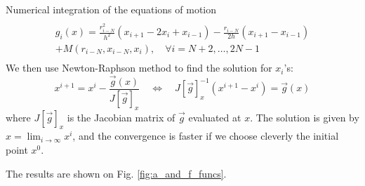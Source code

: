 \begin{subsection}{Numerical integration of the equations of motion}
\begin{multline}
  \end{multline}
  \begin{multline}
    g_i(x) = \frac{r_{i-N}^2}{h^2}\left(x_{i+1}-2x_i+x_{i-1}\right)-\frac{r_{i-N}}{2h}\left(x_{i+1}-x_{i-1}\right)\\
    +M(r_{i-N}, x_{i-N}, x_i),\quad
    \forall i = N+2,\dots,2N-1\\
  \end{multline}
  We then use Newton-Raphson method to find the solution for
  $x_i$'s:
  \begin{equation}
    x^{i+1} = x^i - \frac{\vec g(x)}{J[\vec g]_x}\quad \Longleftrightarrow\quad J[\vec g]_x^{-1}\left(x^{i+1}-x^i\right) = \vec g(x)
  \end{equation}
  where $J[\vec g]_x$ is the Jacobian matrix of $\vec g$ evaluated at
  $x$. The solution is given by $x = \lim_{i\to\infty}x^i$, and the
  convergence is faster if we choose cleverly the initial point $x^0$.

  The results are shown on Fig. \ref{fig:a_and_f_funcs}.

\end{subsection}
